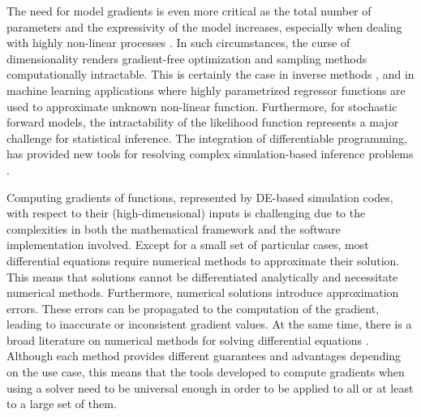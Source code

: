The need for model gradients is even more critical as the total number of parameters and the expressivity of the model increases, especially when dealing with highly non-linear processes \cite{Karniadakis_Kevrekidis_Lu_Perdikaris_Wang_Yang_2021}.
In such circumstances, the curse of dimensionality renders gradient-free optimization and sampling methods computationally intractable. 
This is certainly the case in inverse methods \cite{Tarantola:2007wu}, and in
machine learning applications \cite{LeCun2015} where highly parametrized regressor functions are used to approximate unknown non-linear function.
Furthermore, for stochastic forward models, the intractability of the likelihood function represents a major challenge for statistical inference.
The integration of differentiable programming, has provided new tools for resolving complex simulation-based inference problems \cite{Cranmer_Brehmer_Louppe_2020}.

Computing gradients of functions, represented by DE-based simulation codes, with respect to their (high-dimensional) inputs is challenging due to the complexities in both the mathematical framework and the software implementation involved.
Except for a small set of particular cases, most differential equations require numerical methods to approximate their solution.
This means that solutions cannot be differentiated analytically and necessitate numerical methods. 
Furthermore, numerical solutions introduce approximation errors. 
These errors can be propagated to the computation of the gradient, leading to inaccurate or inconsistent gradient values. 
At the same time, there is a broad literature on numerical methods for solving differential equations \cite{hairer-solving-1, hairer-solving-2}. 
Although each method provides different guarantees and advantages depending on the use case, this means that the tools developed to compute gradients when using a solver need to be universal enough in order to be applied to all or at least to a large set of them. 

